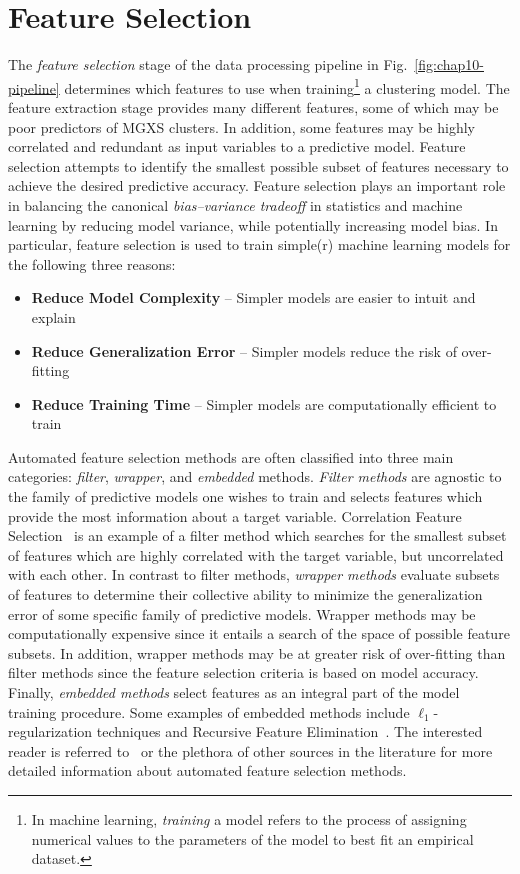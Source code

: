 \section{Feature Selection}
\label{sec:chap10-feature-select}

The \textit{feature selection} stage of the data processing pipeline in Fig.~\ref{fig:chap10-pipeline} determines which features to use when training\footnote{In machine learning, \textit{training} a model refers to the process of assigning numerical values to the parameters of the model to best fit an empirical dataset.} a clustering model. The feature extraction stage provides many different features, some of which may be poor predictors of \ac{MGXS} clusters. In addition, some features may be highly correlated and redundant as input variables to a predictive model. Feature selection attempts to identify the smallest possible subset of features necessary to achieve the desired predictive accuracy. Feature selection plays an important role in balancing the canonical \textit{bias--variance tradeoff} in statistics and machine learning by reducing model variance, while potentially increasing model bias. In particular, feature selection is used to train simple(r) machine learning models for the following three reasons:

\begin{itemize}[noitemsep]
\item \textbf{Reduce Model Complexity} -- Simpler models are easier to intuit and explain
\item \textbf{Reduce Generalization Error} -- Simpler models reduce the risk of over-fitting
\item \textbf{Reduce Training Time} -- Simpler models are computationally efficient to train
\end{itemize}

Automated feature selection methods are often classified into three main categories: \textit{filter}, \textit{wrapper}, and \textit{embedded} methods. \textit{Filter methods} are agnostic to the family of predictive models one wishes to train and selects features which provide the most information about a target variable. Correlation Feature Selection~\cite{hall1999correlation} is an example of a filter method which searches for the smallest subset of features which are highly correlated with the target variable, but uncorrelated with each other. In contrast to filter methods, \textit{wrapper methods} evaluate subsets of features to determine their collective ability to minimize the generalization error of some specific family of predictive models. Wrapper methods may be computationally expensive since it entails a search of the space of possible feature subsets. In addition, wrapper methods may be at greater risk of over-fitting than filter methods since the feature selection criteria is based on model accuracy. Finally, \textit{embedded methods} select features as an integral part of the model training procedure. Some examples of embedded methods include $\ell_{1}$-regularization techniques and Recursive Feature Elimination~\cite{guyon2002rfe}. The interested reader is referred to~\cite{guyon2003select} or the plethora of other sources in the literature for more detailed information about automated feature selection methods.

